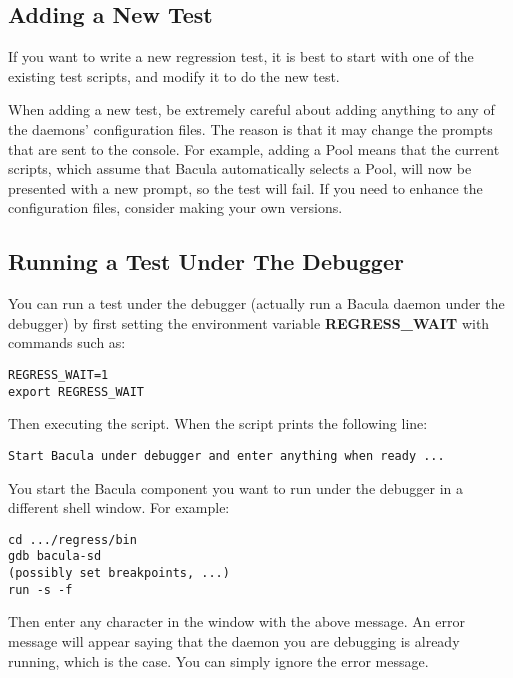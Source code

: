 \subsection{Adding a New Test}

If you want to write a new regression test, it is best to start with one of
the existing test scripts, and modify it to do the new test. 

When adding a new test, be extremely careful about adding anything to any of
the daemons' configuration files. The reason is that it may change the prompts
that are sent to the console. For example, adding a Pool means that the
current scripts, which assume that Bacula automatically selects a Pool, will
now be presented with a new prompt, so the test will fail. If you need to
enhance the configuration files, consider making your own versions. 

\subsection{Running a Test Under The Debugger}
You can run a test under the debugger (actually run a Bacula daemon
under the debugger) by first setting the environment variable
{\bf REGRESS\_WAIT} with commands such as:

\begin{verbatim}
REGRESS_WAIT=1
export REGRESS_WAIT
\end{verbatim}

Then executing the script.  When the script prints the following line:

\begin{verbatim}
Start Bacula under debugger and enter anything when ready ...
\end{verbatim}

You start the Bacula component you want to run under the debugger in a
different shell window.  For example:

\begin{verbatim}
cd .../regress/bin
gdb bacula-sd 
(possibly set breakpoints, ...)
run -s -f
\end{verbatim}

Then enter any character in the window with the above message. 
An error message will appear saying that the daemon you are debugging
is already running, which is the case. You can simply ignore the
error message.  
